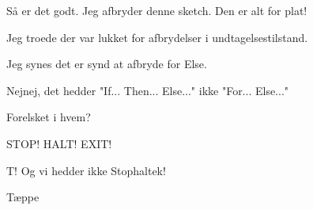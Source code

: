 \documentclass[danish]{article}
\begin{document}
\begin{sketch}
 Så er det godt. Jeg afbryder denne sketch. Den er alt for plat!

 Jeg troede der var lukket for afbrydelser i undtagelsestilstand.

 Jeg synes det er synd at afbryde for Else.

 Nejnej, det hedder "If... Then... Else..." ikke "For... Else..."

 Forelsket i hvem?

 STOP! HALT! EXIT!

 T! Og vi hedder ikke Stophaltek!

\scene Tæppe

\end{sketch}
\end{document}
